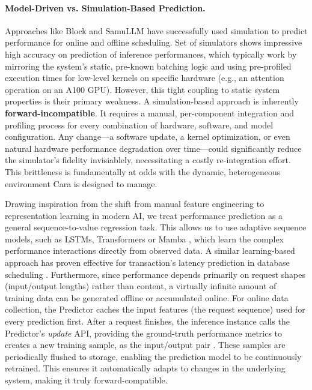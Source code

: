 \documentclass[letterpaper, anonymous, twocolumn, 10pt]{article}
\begin{document}
\paragraph{Model-Driven vs. Simulation-Based Prediction.}
Approaches like Block\cite{da2025blockbalancingloadllm} and SamuLLM\cite{SamuLLM} have successfully used simulation to predict performance for online and offline scheduling. Set of simulators \cite{kumar2025simulatingllmtraining, tan2025frontiersimulatingnext, kim2024llmservingsimhwswcosimulation, Agrawal2024VidurAL} shows impressive high accuracy on prediction of inference performances, which typically work by mirroring the system's static, pre-known batching logic and using pre-profiled execution times for low-level kernels on specific hardware (e.g., an attention operation on an A100 GPU). However, this tight coupling to static system properties is their primary weakness. A simulation-based approach is inherently \textbf{forward-incompatible}. It requires a manual, per-component integration and profiling process for every combination of hardware, software, and model configuration. Any change—a software update, a kernel optimization, or even natural hardware performance degradation over time—could significantly reduce the simulator's fidelity invisiablely, necessitating a costly re-integration effort. This brittleness is fundamentally at odds with the dynamic, heterogeneous environment Cara is designed to manage.

Drawing inspiration from the shift from manual feature engineering to representation learning in modern AI, we treat performance prediction as a general sequence-to-value regression task. This allows us to use adaptive sequence models, such as LSTMs\cite{lstm}, Transformers\cite{attentionIsAllUrneed} or Mamba \cite{mamaba}, which learn the complex performance interactions directly from observed data. A similar learning-based approach has proven effective for transaction's latency prediction in database scheduling \cite{wu2025improvingdbmsschedulingdecisions}. Furthermore, since performance depends primarily on request shapes (input/output lengths) rather than content, a virtually infinite amount of training data can be generated offline or accumulated online. For online data collection, the Predictor caches the input features (the request sequence) used for every prediction first. After a request finishes, the inference instance calls the Predictor's \textit{update} API, providing the ground-truth performance metrics to creates a new training sample, as the input/output pair . These samples are periodically flushed to storage, enabling the prediction model to be continuously retrained. This ensures it automatically adapts to changes in the underlying system, making it truly forward-compatible.
\end{document}
